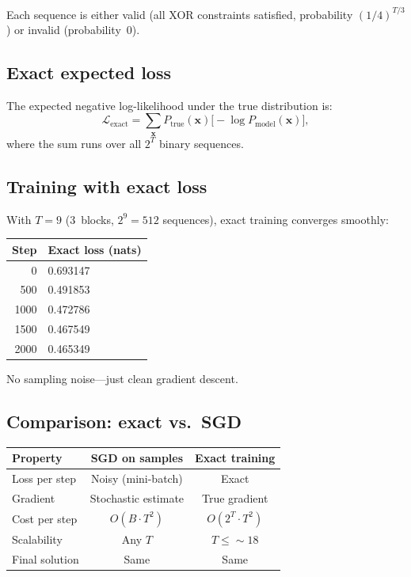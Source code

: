 \documentclass[11pt]{article}
\begin{document}
Each sequence is either valid (all XOR constraints satisfied, probability
$(1/4)^{T/3}$) or invalid (probability~0).

\subsection{Exact expected loss}

The expected negative log-likelihood under the true distribution is:
\begin{equation}\label{eq:exact_loss}
  \mathcal{L}_{\text{exact}}
  = \sum_{\mathbf{x}} P_{\text{true}}(\mathbf{x})
    \bigl[-\log P_{\text{model}}(\mathbf{x})\bigr],
\end{equation}
where the sum runs over all $2^T$ binary sequences.

\subsection{Training with exact loss}

With $T = 9$ (3~blocks, $2^9 = 512$ sequences), exact training converges
smoothly:
\begin{center}
\begin{tabular}{rl}
\toprule
Step & Exact loss (nats) \\
\midrule
0    & 0.693147 \\
500  & 0.491853 \\
1000 & 0.472786 \\
1500 & 0.467549 \\
2000 & 0.465349 \\
\bottomrule
\end{tabular}
\end{center}
No sampling noise---just clean gradient descent.

\subsection{Comparison: exact vs.\ SGD}

\begin{center}
\begin{tabular}{lcc}
\toprule
Property & SGD on samples & Exact training \\
\midrule
Loss per step & Noisy (mini-batch) & Exact \\
Gradient      & Stochastic estimate & True gradient \\
Cost per step & $O(B \cdot T^2)$   & $O(2^T \cdot T^2)$ \\
Scalability   & Any $T$            & $T \leq {\sim}18$ \\
Final solution& Same               & Same \\
\bottomrule
\end{tabular}
\end{center}
\end{document}
